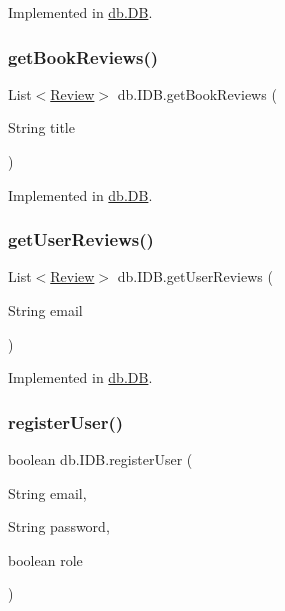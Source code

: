 Implemented in \hyperlink{classdb_1_1_d_b_ad02e4c78f9afe64af34fb2e5889ce501}{db.\+DB}.

\mbox{\label{interfacedb_1_1_i_d_b_a6b8fda48df77b542b8713bc4f035bccf}} 
\subsubsection{\texorpdfstring{get\+Book\+Reviews()}{getBookReviews()}}
{\footnotesize\ttfamily List$<$\hyperlink{classserver_1_1data_1_1_review}{Review}$>$ db.\+I\+D\+B.\+get\+Book\+Reviews (\begin{DoxyParamCaption}\item[{String}]{title }\end{DoxyParamCaption})}



Implemented in \hyperlink{classdb_1_1_d_b_a02a42ee97d8e7189733dfc720a05452e}{db.\+DB}.

\mbox{\label{interfacedb_1_1_i_d_b_afd7ee8924344c13a64a1363d1a295771}} 
\subsubsection{\texorpdfstring{get\+User\+Reviews()}{getUserReviews()}}
{\footnotesize\ttfamily List$<$\hyperlink{classserver_1_1data_1_1_review}{Review}$>$ db.\+I\+D\+B.\+get\+User\+Reviews (\begin{DoxyParamCaption}\item[{String}]{email }\end{DoxyParamCaption})}



Implemented in \hyperlink{classdb_1_1_d_b_a9ef4c302b91da17852f09a27a90fb4b5}{db.\+DB}.

\mbox{\label{interfacedb_1_1_i_d_b_a92913d9357ef22978adc35d3fb9d3590}} 
\subsubsection{\texorpdfstring{register\+User()}{registerUser()}}
{\footnotesize\ttfamily boolean db.\+I\+D\+B.\+register\+User (\begin{DoxyParamCaption}\item[{String}]{email,  }\item[{String}]{password,  }\item[{boolean}]{role }\end{DoxyParamCaption})}



